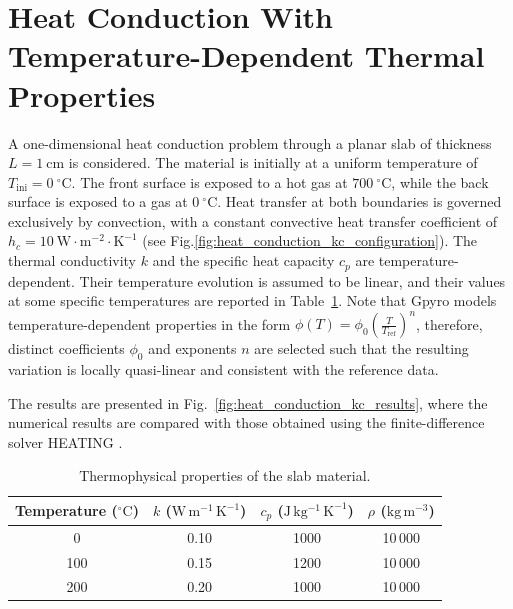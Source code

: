 \documentclass[12pt]{article}
\begin{document}
\fi

\section{Heat Conduction With Temperature-Dependent Thermal Properties}

A one-dimensional heat conduction problem through a planar slab of thickness $L = 1~\mathrm{cm}$ is considered.
The material is initially at a uniform temperature of $T_{\mathrm{ini}} = 0~^\circ\mathrm{C}$.
The front surface is exposed to a hot gas at $700~^\circ\mathrm{C}$, while the back surface is exposed to a gas at $0~^\circ\mathrm{C}$.
Heat transfer at both boundaries is governed exclusively by convection, with a constant convective heat transfer coefficient of $h_c = 10~\mathrm{W\cdot m^{-2}\cdot K^{-1}}$ (see Fig.\ref{fig:heat_conduction_kc_configuration}).
The thermal conductivity $k$ and the specific heat capacity $c_p$ are temperature-dependent. Their temperature evolution is assumed to be linear, and their values at some specific temperatures are reported in Table~\ref{tab:thermal_properties}. Note that Gpyro models temperature-dependent properties in the form $\phi(T) = \phi_0 \left(\frac{T}{T_\mathrm{ref}}\right)^n$, therefore, distinct coefficients $\phi_0$ and exponents $n$ are selected such that the resulting variation is locally quasi-linear and consistent with the reference data.

The results are presented in Fig.~\ref{fig:heat_conduction_kc_results}, where the numerical results are compared with those obtained using the finite-difference solver HEATING \cite{FDS_Verif,HEATING7}.

\begin{table}[H]
\centering
\caption{Thermophysical properties of the slab material.}
\label{tab:thermal_properties}
\renewcommand{\arraystretch}{1.3}
\begin{tabular}{c c c c}
\hline
Temperature ($^\circ\mathrm{C}$) &
$k$ ($\mathrm{W\,m^{-1}\,K^{-1}}$) &
$c_p$ ($\mathrm{J\,kg^{-1}\,K^{-1}}$) &
$\rho$ ($\mathrm{kg\,m^{-3}}$) \\
\hline
0   & 0.10 & 1000 & 10\,000 \\
100 & 0.15 & 1200 & 10\,000 \\
200 & 0.20 & 1000 & 10\,000 \\
\hline
\end{tabular}
\end{table}
\end{document}
